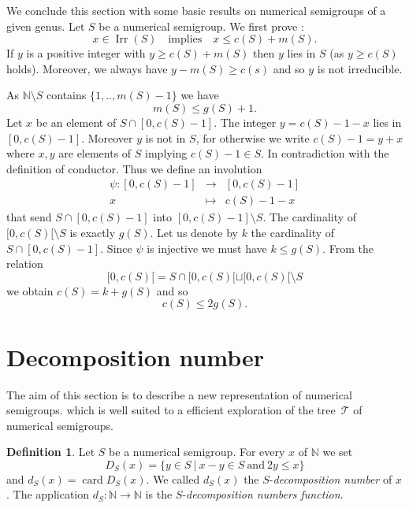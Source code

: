 \documentclass[reqno,11pt]{amsart}
\theoremstyle{plain}
\theoremstyle{definition}
\newtheorem{defi}[prop]{Definition}
\renewcommand{\leq}{\leqslant}
\renewcommand{\geq}{\geqslant}
\newcommand{\NN}{\mathbb{N}}
\DeclareMathOperator{\Irr}{Irr}
\DeclareMathOperator{\card}{card}
\begin{document}
We conclude this section with some basic results on numerical semigroups of a given genus.
Let $S$ be a numerical semigroup. 
We first prove :
\begin{equation}
\label{E:Irr}
x\in \Irr(S)\quad\textrm{implies}\quad x\leq c(S)+m(S).
\end{equation}
If $y$ is a positive integer with $y \geq c(S)+m(S)$ then $y$ lies in $S$ (as $y\geq c(S)$ holds). Moreover, we always have $y-m(S)\geq c(s)$ and so $y$ is not irreducible.

As $\NN\setminus{S}$ contains $\{1,..,m(S)-1\}$ we have 
\begin{equation}
\label{E:m}
m(S)\leq g(S)+1.
\end{equation}
Let $x$ be an element of $S\cap[0,c(S)-1]$. 
The integer $y=c(S)-1-x$ lies in $[0,c(S)-1]$. 
Moreover $y$ is not in $S$, for otherwise  we write $c(S)-1=y+x$ where $x,y$ are elements of $S$ implying $c(S)-1\in S$. 
In contradiction with the definition of conductor. 
Thus we define an involution 
\[
\begin{array}{rcl}
\psi:[0,c(S)-1]&\to&[0,c(S)-1]\\
x&\mapsto&c(S)-1-x
\end{array}
\]
that send $S\cap[0,c(S)-1]$ into $[0,c(S)-1]\setminus S$.
The cardinality of $[0,c(S)[\setminus S$ is exactly $g(S)$. Let us denote by $k$ the cardinality  of $S\cap[0,c(S)-1]$. 
Since $\psi$ is injective we must have $k\leq g(S)$. 
From the relation 
\[
[0,c(S)[=S\cap[0,c(S)[\sqcup[0,c(S)[\setminus S
\]
 we obtain $c(S)=k+g(S)$ and so 
\begin{equation}
\label{E:c}
c(S)\leq 2 g(S).
\end{equation}

\section{Decomposition number}
\label{S:DecNumber}

The aim of this section is to describe a new representation of numerical semigroups.
which is well suited to a efficient exploration of the tree~$\mathcal{T}$ of numerical semigroups. 

\begin{defi}
Let $S$ be a numerical semigroup.
For every $x$ of $\NN$  we set
\[
D_S(x)=\{y \in S\ |\ x-y\in S\ \text{and}\ 2y\leq x\}
\]
and $d_S(x)=\card D_S(x)$.
We called $d_S(x)$ the $S$-\emph{decomposition number} of $x$.
The application $d_S:\NN\to\NN$ is the $S$-\emph{decomposition numbers function}.
\end{defi}
\end{document}
